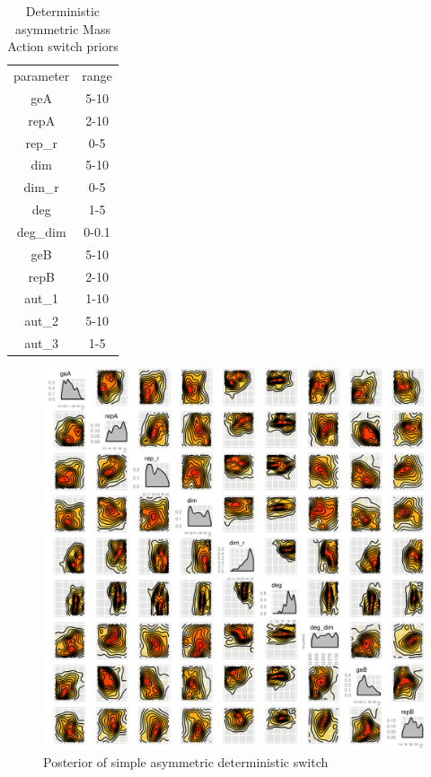 \begin{table}[htbp]
\centering
\caption{Deterministic asymmetric Mass Action switch priors}
\label{tab:asym_cl_det_ma}
\begin{tabular}{cc}
parameter & range \\
geA & 5-10 \\
repA & 2-10 \\
rep\_r & 0-5 \\
dim & 5-10 \\
dim\_r & 0-5 \\
deg & 1-5 \\
deg\_dim & 0-0.1 \\
geB & 5-10 \\
repB & 2-10 \\
aut\_1 & 1-10\\
aut\_2 & 5-10\\
aut\_3 & 1-5\\
\end{tabular}
\end{table}

\begin{figure}[htbp]
\begin{center}
\includegraphics[scale=0.15]{chapterModelling/mass_action_switches/deterministic/asym/posterior_cl.png}
\caption{Posterior of simple asymmetric deterministic switch}\label{fig:asym_det_cl_ma_post}
\end{center}
\end{figure}

